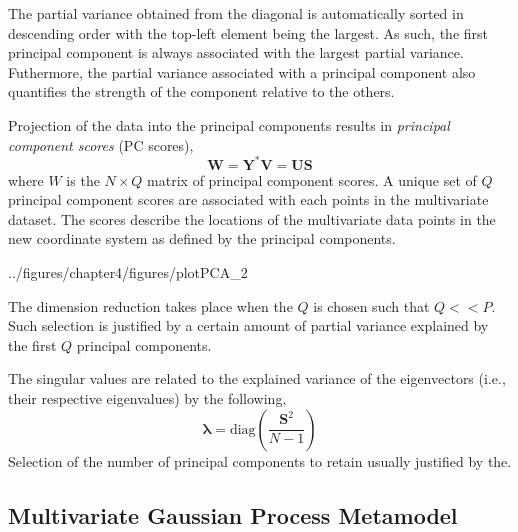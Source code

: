 The partial variance obtained from the diagonal is automatically sorted in descending order with the top-left element being the largest.
As such, the first principal component is always associated with the largest partial variance.
Futhermore, the partial variance associated with a principal component also quantifies the strength of the component relative to the others.

Projection of the data into the principal components results in \emph{principal component scores} (PC scores),
\begin{equation}
	\mathbf{W} = \mathbf{Y}^* \mathbf{V} = \mathbf{U} \mathbf{S}
\label{eq:pc_scores}
\end{equation}
where $W$ is the $N \times Q$ matrix of principal component scores.
A unique set of $Q$ principal component scores are associated with each points in the multivariate dataset.
The scores describe the locations of the multivariate data points in the new coordinate system as defined by the principal components.

{../figures/chapter4/figures/plotPCA_2}

The dimension reduction takes place when the $Q$ is chosen such that $Q << P$.
Such selection is justified by a certain amount of partial variance explained by the first $Q$ principal components.

The singular values are related to the explained variance of the eigenvectors (i.e., their respective eigenvalues) by the following,
\begin{equation}
	\boldsymbol{\lambda} = \text{diag}\left(\frac{\mathbf{S}^2}{N-1}\right)
\label{eq:singular_values_variance}
\end{equation}
Selection of the number of principal components to retain usually justified by the.


\subsection{Multivariate Gaussian Process Metamodel}\label{sub:gp_multivariate}

